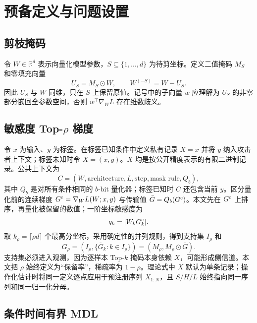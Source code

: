\documentclass[conference,a4paper]{IEEEtran}
\newcommand{\R}{\mathbb{R}}
\begin{document}
\section{预备定义与问题设置}

\subsection{剪枝掩码}

令 $W\in\R^d$ 表示向量化模型参数，$S\subseteq\{1,\ldots,d\}$ 为待剪坐标。定义二值掩码 $M_S$ 和零填充向量
\begin{equation}
U_S=M_S\odot W,\qquad W^{(-S)}=W-U_S .
\label{eq:mask}
\end{equation}
因此 $U_S$ 与 $W$ 同维，只在 $S$ 上保留原值。记号中的子向量 $w$ 应理解为 $U_S$ 的非零部分嵌回全参数空间，否则 $w^\top\nabla_WL$ 存在维数歧义。

\subsection{\texorpdfstring{敏感度 Top-$\rho$ 梯度}{敏感度 Top-rho 梯度}}

令 $x$ 为输入、$y$ 为标签。在标签已知条件中定义私有记录 $X=x$ 并将 $y$ 纳入攻击者上下文；标签未知时令 $X=(x,y)$。$X$ 均是按公开精度表示的有限二进制记录。公共上下文为
\begin{equation}
C=(W,\text{architecture},L,\text{step},\text{mask rule},Q_b),
\end{equation}
其中 $Q_b$ 是对所有条件相同的 $b$-bit 量化器；标签已知时 $C$ 还包含当前 $y$。区分量化前的连续梯度 $G^{\rm c}=\nabla_WL(W;x,y)$ 与传输值 $\bar G=Q_b(G^{\rm c})$。本文先在 $G^{\rm c}$ 上排序，再量化被保留的数值；一阶坐标敏感度为
\begin{equation}
q_k=|W_kG^{\rm c}_k|.
\label{eq:gradscore}
\end{equation}
取 $k_\rho=\lceil\rho d\rceil$ 个最高分坐标，采用确定性的并列规则，得到支持集 $I_\rho$ 和
\begin{equation}
G_\rho=(I_\rho,\{\bar G_k:k\in I_\rho\})
=(M_\rho,M_\rho\odot\bar G).
\label{eq:grho}
\end{equation}
支持集必须进入观测，因为逐样本 Top-$k$ 掩码本身依赖 $X$，可能形成侧信道。本文把 $\rho$ 始终定义为“保留率”，稀疏率为 $1-\rho$。理论式中 $X$ 默认为单条记录；操作化估计时将同一定义逐点应用于预注册序列 $X_{1:N}$，且 $S/H/L$ 始终指向同一序列和同一归一化分母。

\subsection{条件时间有界 MDL}
\end{document}
